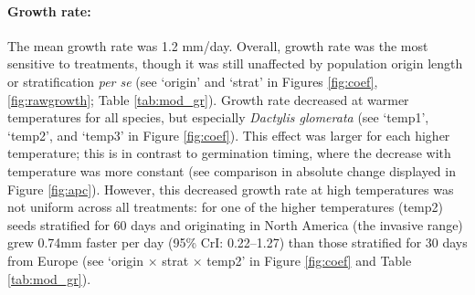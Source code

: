 \documentclass[12pt]{article}\usepackage[]{graphicx}\usepackage[]{color}
\begin{document}
	\paragraph{Growth rate:} The mean growth rate was 1.2 mm/day. Overall, growth rate was the most sensitive to treatments, though it was still unaffected by population origin length or stratification \textit{per se} (see `origin' and `strat' in Figures \ref{fig:coef}, \ref{fig:rawgrowth}; Table \ref{tab:mod_gr}). Growth rate decreased at warmer temperatures for all species, but especially \textit{Dactylis glomerata} (see `temp1', `temp2', and `temp3' in Figure \ref{fig:coef}). This effect was larger for each higher temperature; this is in contrast to germination timing, where the decrease with temperature was more constant (see comparison in absolute change displayed in Figure \ref{fig:apc}). However, this decreased growth rate at high temperatures was not uniform across all treatments: for one of the higher temperatures (temp2) seeds stratified for 60 days and originating in North America (the invasive range) grew 0.74mm faster per day (95\% CrI: 0.22--1.27) than those stratified for 30 days from Europe (see `origin $\times$ strat $\times$ temp2' in Figure \ref{fig:coef} and Table \ref{tab:mod_gr}). 
\end{document}

